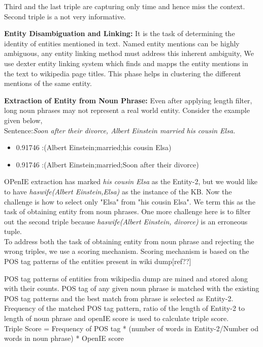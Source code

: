 Third and the last triple are capturing only time and hence miss the context. Second triple is a not very informative.

\textbf{Entity Disambiguation and Linking:} It is the task of determining the identity of entities mentioned in text.
Named entity mentions can be highly ambiguous, any entity linking method must address this inherent ambiguity, 
We use dexter entity linking system which finds and mapps the entity mentions in the text to wikipedia page titles. 
This phase helps in clustering the different mentions of the same entity.

\textbf{Extraction of Entity from Noun Phrase:}
Even after applying length filter, long noun phrases may not represent a real world entity. Consider the example given below,\\
Sentence:\textit{Soon after their divorce, Albert Einstein married his cousin Elsa.}
\begin{itemize}
\item{0.91746 :(Albert Einstein;married;his cousin Elsa)}
\item{0.91746 :(Albert Einstein;married;Soon after their divorce)}
\end{itemize}
OPenIE extraction has marked \textit{his cousin Elsa} as the Entity-2, but we would like to have \textit{haswife(Albert Einstein,Elsa)} as the instance of the KB. Now the challenge is how to 
select only "Elsa" from "his cousin Elsa". We term this as the task of obtaining entity from noun phrases.
One more challenge here is to filter out the second triple because \textit{haswife(Albert Einstein, divorce)} is an erroneous tuple.\\

To address both the task of obtaining entity from noun phrase and rejecting the wrong triples, we use a scoring mechanism. Scoring mechanism is based on the POS tag patterns of the entities present in wiki dump[ref??]

POS tag patterns of entities from wikipedia dump are mined and stored along with their counts. POS tag of any given noun phrase is matched with the existing POS tag patterns and the best match from phrase is selected as Entity-2.
Frequency of the matched POS tag pattern, ratio of the length of Entity-2 to length of noun phrase and openIE score is used to calculate triple score.\\

Triple Score = Frequency of POS tag * (number of words in Entity-2/Number od words in noun phrase) * OpenIE score\\

